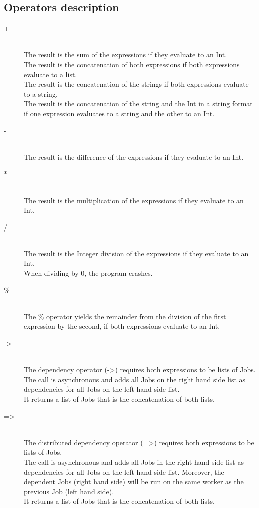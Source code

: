\subsection{Operators description}
\begin{description}
\item[+] \hfil \\
The result is the sum of the expressions if they evaluate to an Int.\\
The result is the concatenation of both expressions if both expressions evaluate to
a list.\\
The result is the concatenation of the strings if both expressions evaluate to
a string.\\
The result is the concatenation of the string and the Int in a string format if
one expression evaluates to a string and the other to an Int.\\

\item[-] \hfil \\
The result is the difference of the expressions if they evaluate to an Int.

\item[*] \hfil \\
The result is the multiplication of the expressions if they evaluate to an Int.

\item[/] \hfil \\
The result is the Integer division of the expressions if they evaluate to an Int.\\
When dividing by 0, the program crashes.

\item[\%] \hfil \\
The \% operator yields the remainder from the division of the first expression by the second, if
both expressions evaluate to an Int.

\item[->] \hfil \\
The dependency operator (->) requires both expressions to be lists of Jobs.\\
The call is asynchronous and adds all Jobs on the right hand side list as dependencies
for all Jobs on the left hand side list.\\
It returns a list of Jobs that is the concatenation of both lists.

\item[=>] \hfil \\
The distributed dependency operator (=>) requires both expressions to be lists of Jobs.\\
The call is asynchronous and adds all Jobs in the right hand side list as dependencies
for all Jobs on the left hand side list. Moreover, the dependent Jobs (right
hand side)  will be run on the same worker as the previous Job (left hand
side).\\
It returns a list of Jobs that is the concatenation of both lists.


\end{description}
